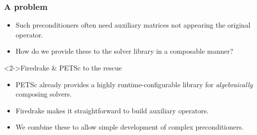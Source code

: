 \documentclass[presentation]{beamer}
\begin{document}
\begin{frame}
  \frametitle{A problem}
  \begin{itemize}
  \item Such preconditioners often need auxiliary matrices not
    appearing the original operator.
  \item How do we provide these to the solver library in a composable
    manner?
  \end{itemize}
  \begin{block}<2->{Firedrake \& PETSc to the rescue}
  \begin{itemize}
  \item PETSc already provides a highly runtime-configurable library
    for \emph{algebraically} composing solvers. \nocite{Brown:2012}

  \item Firedrake makes it straightforward to build auxiliary
    operators.

  \item We combine these to allow simple development of complex
    preconditioners.
  \end{itemize}
  \end{block}
\end{frame}
\end{document}

